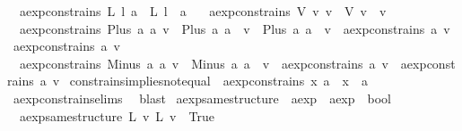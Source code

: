 \begin{isabellebody}
\ \ {\isachardoublequoteopen}aexp{\isacharunderscore}constrains\ {\isacharparenleft}L\ l{\isacharparenright}\ a\ {\isacharequal}\ {\isacharparenleft}L\ l\ {\isacharequal}\ a{\isacharparenright}{\isachardoublequoteclose}\ {\isacharbar}\isanewline
\ \ {\isachardoublequoteopen}aexp{\isacharunderscore}constrains\ {\isacharparenleft}V\ v{\isacharparenright}\ v{\isacharprime}\ {\isacharequal}\ {\isacharparenleft}V\ v\ {\isacharequal}\ v{\isacharprime}{\isacharparenright}{\isachardoublequoteclose}\ {\isacharbar}\isanewline
\ \ {\isachardoublequoteopen}aexp{\isacharunderscore}constrains\ {\isacharparenleft}Plus\ a{}\ a{}{\isacharparenright}\ v\ {\isacharequal}\ {\isacharparenleft}{\isacharparenleft}Plus\ a{}\ a{}{\isacharparenright}\ {\isacharequal}\ v\ {\isasymor}\ {\isacharparenleft}Plus\ a{}\ a{}{\isacharparenright}\ {\isacharequal}\ v\ {\isasymor}\ {\isacharparenleft}aexp{\isacharunderscore}constrains\ a{}\ v\ {\isasymor}\ aexp{\isacharunderscore}constrains\ a{}\ v{\isacharparenright}{\isacharparenright}{\isachardoublequoteclose}\ {\isacharbar}\isanewline
\ \ {\isachardoublequoteopen}aexp{\isacharunderscore}constrains\ {\isacharparenleft}Minus\ a{}\ a{}{\isacharparenright}\ v\ {\isacharequal}\ {\isacharparenleft}{\isacharparenleft}Minus\ a{}\ a{}{\isacharparenright}\ {\isacharequal}\ v\ {\isasymor}\ {\isacharparenleft}aexp{\isacharunderscore}constrains\ a{}\ v\ {\isasymor}\ aexp{\isacharunderscore}constrains\ a{}\ v{\isacharparenright}{\isacharparenright}{\isachardoublequoteclose}\isanewline
\isanewline
{}\isamarkupfalse%
\ constrains{\isacharunderscore}implies{\isacharunderscore}not{\isacharunderscore}equal{\isacharcolon}\ {\isachardoublequoteopen}{\isasymnot}\ aexp{\isacharunderscore}constrains\ x\ a\ {\isasymLongrightarrow}\ x\ {\isasymnoteq}\ a{\isachardoublequoteclose}\isanewline
%
\isadelimproof
\ \ %
\endisadelimproof
%
\isatagproof
{}\isamarkupfalse%
\ aexp{\isacharunderscore}constrains{\isachardot}elims{\isacharparenleft}{}{\isacharparenright}\ \isamarkupfalse%
\ blast%
\endisatagproof
{\isafoldproof}%
%
\isadelimproof
\isanewline
%
\endisadelimproof
\isanewline
{}\isamarkupfalse%
\ aexp{\isacharunderscore}same{\isacharunderscore}structure\ {\isacharcolon}{\isacharcolon}\ {\isachardoublequoteopen}aexp\ {\isasymRightarrow}\ aexp\ {\isasymRightarrow}\ bool{\isachardoublequoteclose}\ \isanewline
\ \ {\isachardoublequoteopen}aexp{\isacharunderscore}same{\isacharunderscore}structure\ {\isacharparenleft}L\ v{\isacharparenright}\ {\isacharparenleft}L\ v{\isacharprime}{\isacharparenright}\ {\isacharequal}\ True{\isachardoublequoteclose}\ {\isacharbar}\isanewline

\end{isabellebody}
